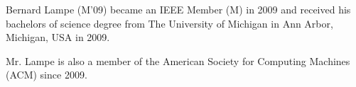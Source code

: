 \documentclass[journal]{IEEEtran}
\begin{document}
\nocite{*}



\begin{IEEEbiographynophoto}{Bernard Lampe}
(M'09) became an IEEE Member (M) in 2009 and received his bachelors of science degree from The University of Michigan in Ann Arbor, Michigan, USA in 2009.
\par Mr. Lampe is also a member of the American Society for Computing Machines (ACM) since 2009.
\end{IEEEbiographynophoto}

\end{document}
